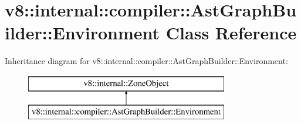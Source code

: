\hypertarget{classv8_1_1internal_1_1compiler_1_1_ast_graph_builder_1_1_environment}{}\section{v8\+:\+:internal\+:\+:compiler\+:\+:Ast\+Graph\+Builder\+:\+:Environment Class Reference}
\label{classv8_1_1internal_1_1compiler_1_1_ast_graph_builder_1_1_environment}
Inheritance diagram for v8\+:\+:internal\+:\+:compiler\+:\+:Ast\+Graph\+Builder\+:\+:Environment\+:\begin{figure}[H]
\begin{center}
\leavevmode
\includegraphics[height=2.000000cm]{classv8_1_1internal_1_1compiler_1_1_ast_graph_builder_1_1_environment}
\end{center}
\end{figure}
